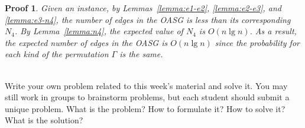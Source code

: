 \documentclass[]{article}
\newtheorem{Proof}{Proof}
\begin{document}
\begin{qunlist}
{{\begin{Proof}
Given an instance, by Lemmas~\ref{lemma:e1-e2}, \ref{lemma:e2-e3}, and \ref{lemma:e3-n4}, the number of edges in the OASG is less than its corresponding $N_4$. By Lemma~\ref{lemma:n4}, the expected value of $N_4$ is $O(n\lg n)$. As a result, the expected number of edges in the OASG is $O(n\lg n)$ since the probability for each kind of the permutation $\Gamma$ is the same.
\end{Proof}
}} \fi

 \\
Write your own problem related to this week's material and solve it. You may still work in groups to brainstorm problems, but each student should submit a unique problem. What is the problem? How to formulate it? How to solve it? What is the solution?
    
\end{qunlist}
\end{document}
